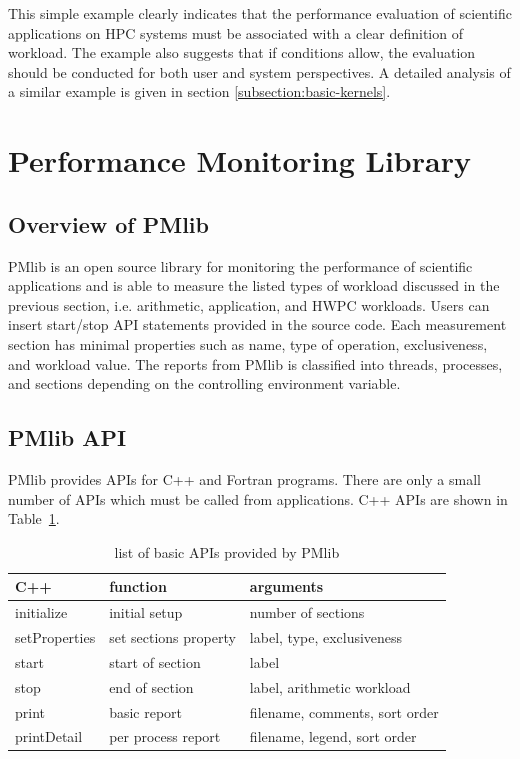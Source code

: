\documentclass[conference]{IEEEtran}
\begin{document}
This simple example clearly indicates that the performance evaluation of
scientific applications on HPC systems must be associated with a clear
definition of workload. The example also suggests that if conditions allow,
the evaluation should be
conducted for both user and system perspectives.
A detailed analysis of a similar example is given in section
\ref{subsection:basic-kernels}.

\section{Performance Monitoring Library}
\label{section:PMlib}

%
\subsection {Overview of PMlib}
PMlib is an open source library for monitoring the performance of scientific
applications and is able to measure the listed types of workload discussed
in the previous section, i.e. arithmetic, application, and HWPC workloads.
Users can insert start/stop API statements provided in the source code.
Each measurement section has minimal properties such as name, type of operation,
exclusiveness, and workload value.
The reports from PMlib is classified into threads, processes, and sections
depending on the controlling environment variable.

%
\subsection{PMlib API}
PMlib provides APIs for C++ and Fortran programs.
There are only a small number of APIs which must be called from applications.
C++ APIs are shown in Table~\ref{tab:PMlib-API}. 

\begin{table}[htb]
\footnotesize
\caption{list of basic APIs provided by PMlib}
\label{tab:PMlib-API}
\begin{tabular}{l|l|l} \hline
C++	& function	&	arguments	\\ \hline \hline
initialize	& initial setup	& number of sections \\ %
setProperties	& set sections property	& label, type, exclusiveness \\ %
start	& start of section	& label \\ %
stop	& end of section	& label, arithmetic workload \\ %
print	& basic report	& filename, comments, sort order	\\ %
printDetail	& per process report	& filename, legend, sort order	\\ %
\end{tabular}
\end{table}
\end{document}
